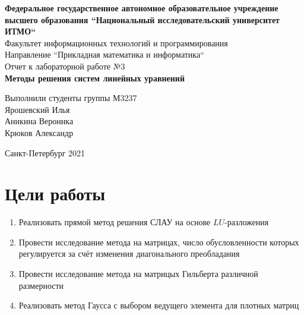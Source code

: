 \documentclass[english]{article}
\date{}
\title{}
\begin{document}
\begin{titlepage}
    \begin{center}
        \large\textbf{Федеральное государственное автономное образовательное учреждение высшего образования ``Национальный исследовательский университет ИТМО``} \\
        \vspace{0.5cm}
        Факультет информационных технологий и программирования \\
        \vspace{0.5cm}
        Направление ``Прикладная математика и информатика`` \\
        \vspace{3cm}
        Отчет к лабораторной работе №3 \\
        \vspace{0.5cm}
        \textbf{Методы решения систем линейных уравнений}
    \end{center}
    \vfill
    \begin{flushright}
        \large
        Выполнили студенты группы М3237 \\
        \vspace{0.5cm}
        Ярошевский Илья \\
        Аникина Вероника \\
    Крюков Александр
    \end{flushright}
    \vspace{3cm}
    \begin{center}
        Санкт-Петербург 2021
    \end{center}
\end{titlepage}

\section{Цели работы}

\begin{enumerate}
    \item Реализовать прямой метод решения СЛАУ на основе \(LU\)-разложения
    \item Провести исследование метода на матрицах, число обусловленности которых регулируется за счёт изменения диагонального  преобладания 
    \item Провести исследование метода на матрицых Гильберта различной размерности
    \item Реализовать метод Гаусса с выбором ведущего элемента для плотных матриц
\end{enumerate}
\end{document}
